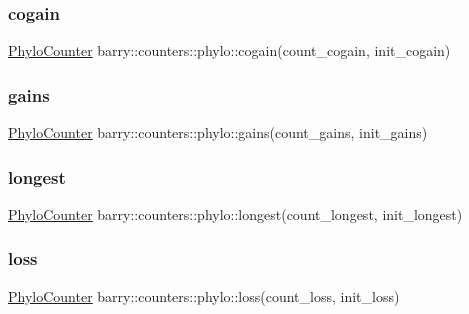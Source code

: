 \subsubsection{\texorpdfstring{cogain}{cogain}}
{\footnotesize\ttfamily \hyperlink{namespacebarry_1_1counters_1_1phylo_aa4a36956c99f63ed02b7068a495bb56a}{Phylo\+Counter} barry\+::counters\+::phylo\+::cogain(count\+\_\+cogain, init\+\_\+cogain)}

\mbox{\label{namespacebarry_1_1counters_1_1phylo_adb9fd1ed2c6af82bd0deecebe5e41c0d}} 
\subsubsection{\texorpdfstring{gains}{gains}}
{\footnotesize\ttfamily \hyperlink{namespacebarry_1_1counters_1_1phylo_aa4a36956c99f63ed02b7068a495bb56a}{Phylo\+Counter} barry\+::counters\+::phylo\+::gains(count\+\_\+gains, init\+\_\+gains)}

\mbox{\label{namespacebarry_1_1counters_1_1phylo_a558ab73b56530347c45f8a3f2481f74d}} 
\subsubsection{\texorpdfstring{longest}{longest}}
{\footnotesize\ttfamily \hyperlink{namespacebarry_1_1counters_1_1phylo_aa4a36956c99f63ed02b7068a495bb56a}{Phylo\+Counter} barry\+::counters\+::phylo\+::longest(count\+\_\+longest, init\+\_\+longest)}

\mbox{\label{namespacebarry_1_1counters_1_1phylo_a12cebdc97bb77ae2bb660fc48640596f}} 
\subsubsection{\texorpdfstring{loss}{loss}}
{\footnotesize\ttfamily \hyperlink{namespacebarry_1_1counters_1_1phylo_aa4a36956c99f63ed02b7068a495bb56a}{Phylo\+Counter} barry\+::counters\+::phylo\+::loss(count\+\_\+loss, init\+\_\+loss)}

